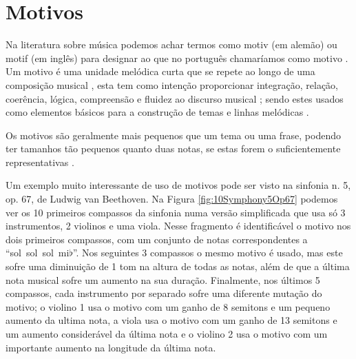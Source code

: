 \section{Motivos}
\label{sec:Motivo}

Na literatura sobre música podemos achar termos como motiv (em alemão) ou motif (em inglês)
para designar ao que no português chamaríamos como motivo \cite[pp. 984]{latham2008diccionario}.
Um motivo é uma unidade melódica curta que se repete ao longo de uma composição musical \cite[pp. 545]{apel1969harvard},
esta tem como intenção proporcionar integração, relação, coerência, lógica, 
compreensão e fluidez ao discurso musical \cite[pp. 984]{latham2008diccionario};
sendo estes usados como elementos básicos para a construção
de temas e linhas melódicas \cite[pp. 984]{latham2008diccionario}.

Os motivos são geralmente mais pequenos que um tema ou uma frase,
podendo ter tamanhos tão pequenos quanto duas notas,
se estas forem o suficientemente representativas \cite[pp. 545]{apel1969harvard}.


\begin{example}
Um exemplo muito interessante de uso de motivos pode ser visto na sinfonia n. 5, op. 67, 
de Ludwig van Beethoven.
Na Figura \ref{fig:10Symphony5Op67} podemos ver os 10 primeiros compassos da sinfonia 
numa versão simplificada que usa só 3 instrumentos, 2 violinos e uma viola.
Nesse fragmento é identificável o motivo nos dois primeiros compassos,
com um conjunto de notas correspondentes a ``sol~sol~sol~mi$\flat$''.
Nos seguintes 3 compassos o mesmo motivo é usado, 
mas este sofre uma diminuição de 1 tom na altura de todas as notas, 
além de que a última nota musical sofre um aumento na sua duração. 
Finalmente, nos últimos 5 compassos, cada instrumento por separado sofre uma diferente mutação do motivo;
o violino 1 usa o motivo com um ganho de 8 semitons e um pequeno aumento da ultima nota,
a viola usa o motivo com um ganho de 13 semitons e um aumento considerável da última nota e
o violino 2 usa o motivo com um importante aumento na longitude da última nota.
\end{example}


